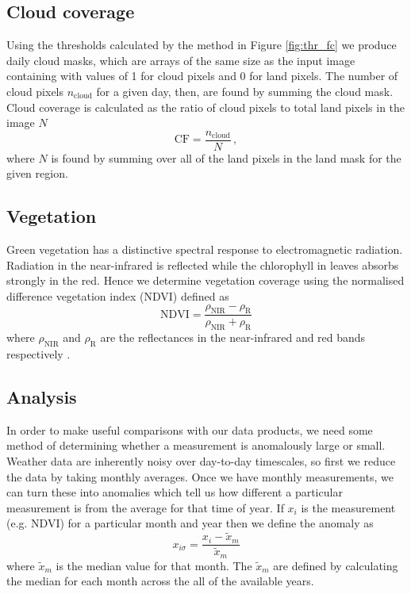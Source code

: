 \subsection{Cloud coverage}
Using the thresholds calculated by the method in Figure \ref{fig:thr_fc} we
produce daily cloud masks, which are arrays of the same size as the input image
containing with values of 1 for cloud pixels and 0 for land pixels. The number
of cloud pixels $n_{\mathrm{cloud}}$ for a given day, then, are found by summing
the cloud mask. Cloud coverage is calculated as the ratio of cloud pixels to
total land pixels in the image $N$
\begin{equation}
  \mathrm{CF} = \frac{n_{\mathrm{cloud}}}{N} \,,
  \label{eq:cloud_frac}
\end{equation}
where $N$ is found by summing over all of the land pixels in the land mask for
the given region.

\subsection{Vegetation}
Green vegetation has a distinctive spectral response to electromagnetic
radiation. Radiation in the near-infrared is reflected while the chlorophyll in
leaves absorbs strongly in the red. Hence we determine vegetation coverage using
the normalised difference vegetation index (NDVI) defined as
\begin{equation}
  \mathrm{NDVI} = \frac{\rho_{\mathrm{NIR}}-\rho_{\mathrm{R}}}{\rho_{\mathrm{NIR}}+\rho_{\mathrm{R}}}
  \label{eq:ndvi}
\end{equation}
where $\rho_{\mathrm{NIR}}$ and $\rho_{\mathrm{R}}$ are the reflectances in the
near-infrared and red bands respectively \citep{tucker1979}.

\subsection{Analysis}
In order to make useful comparisons with our data products, we need some method
of determining whether a measurement is anomalously large or small. Weather data
are inherently noisy over day-to-day timescales, so first we reduce the data by
taking monthly averages. Once we have monthly measurements, we can turn these
into anomalies which tell us how different a particular measurement is from the
average for that time of year. If $x_{i}$ is the measurement (e.g. NDVI) for a
particular month and year then we define the anomaly as
\begin{equation}
  x_{i\sigma}=\frac{x_{i}-\tilde{x}_m}{\tilde{x}_m}
  \label{eq:anoms}
\end{equation}
where $\tilde{x}_m$ is the median value for that month. The $\tilde{x}_m$ are
defined by calculating the median for each month across the all of the available
years.

